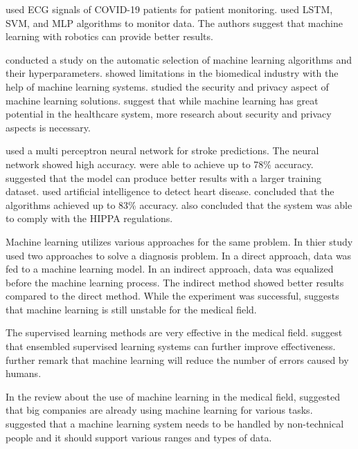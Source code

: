 \documentclass[a4paper,fleqn]{cas-dc}
\begin{document}
\cite*{ref_paper_40} used ECG signals of COVID-19 patients for patient monitoring. \citeauthor{ref_paper_40} used LSTM, SVM, and MLP algorithms to monitor data. The authors suggest that machine learning with robotics can provide better results.

\cite*{ref_paper_32} conducted a study on the automatic selection of machine learning algorithms and their hyperparameters. \citeauthor{ref_paper_32} showed limitations in the biomedical industry with the help of machine learning systems. \cite*{ref_paper_37} studied the security and privacy aspect of machine learning solutions. \citeauthor{ref_paper_37} suggest that while machine learning has great potential in the healthcare system, more research about security and privacy aspects is necessary.

\cite*{ref_paper_42} used a multi perceptron neural network for stroke predictions. The neural network showed high accuracy. \citeauthor{ref_paper_42} were able to achieve up to 78\% accuracy. \citeauthor{ref_paper_42} suggested that the model can produce better results with a larger training dataset. \cite*{ref_paper_41} used artificial intelligence to detect heart disease. \citeauthor{ref_paper_41} concluded that the algorithms achieved up to 83\% accuracy. \citeauthor{ref_paper_41} also concluded that the system was able to comply with the HIPPA regulations.

Machine learning utilizes various approaches for the same problem. In thier study \cite*{ref_paper_8} used two approaches to solve a diagnosis problem. In a direct approach, data was fed to a machine learning model. In an indirect approach, data was equalized before the machine learning process. The indirect method showed better results compared to the direct method. While the experiment was successful, \citeauthor{ref_paper_8} suggests that machine learning is still unstable for the medical field.

The supervised learning methods are very effective in the medical field. \cite*{ref_paper_11} suggest that ensembled supervised learning systems can further improve effectiveness. \citeauthor{ref_paper_11} further remark that machine learning will reduce the number of errors caused by humans.

In the review about the use of machine learning in the medical field, \cite*{ref_paper_33} suggested that big companies are already using machine learning for various tasks. \citeauthor{ref_paper_33} suggested that a machine learning system needs to be handled by non-technical people and it should support various ranges and types of data.
\end{document}
